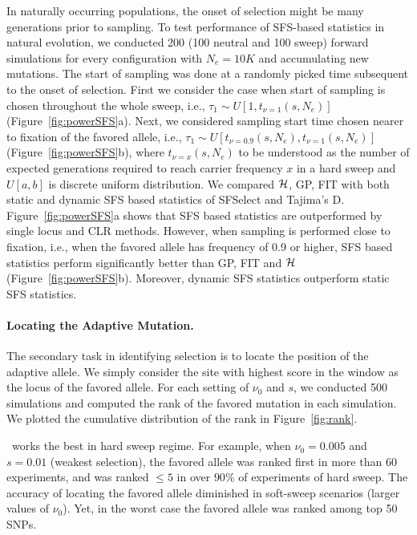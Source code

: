 \documentclass[11pt]{article}
\def\comale{\text{{\sc Comale}}}
\begin{document}
In naturally occurring populations, the onset of selection might be
many generations prior to sampling. To test performance of SFS-based
statistics in natural evolution, we conducted 200 (100 neutral and 100
sweep) forward simulations for every configuration with $N_e=10K$ and
accumulating new mutations. The start of sampling was done at a
randomly picked time subsequent to the onset of selection. First we
consider the case when start of sampling is chosen throughout the
whole sweep, i.e., $\tau_1 \sim U\left[1,t_{\nu=1}(s,N_e)\right]$
(Figure~\ref{fig:powerSFS}a). Next, we considered sampling start time
chosen nearer to fixation of the favored allele, i.e., $\tau_1 \sim
U\left[t_{\nu=0.9}(s,N_e),t_{\nu=1}(s,N_e)\right]$
(Figure~\ref{fig:powerSFS}b), where $t_{\nu=x}(s,N_e)$ to be
understood as the number of expected generations required to reach
carrier frequency $x$ in a hard sweep and $U[a,b]$ is discrete uniform
distribution.  We compared ${\cal H}$, GP, FIT with both static and dynamic
SFS based statistics of SFSelect and Tajima's
D. Figure~\ref{fig:powerSFS}a shows that SFS based statistics are
outperformed by single locus and CLR methods. However, when sampling
is performed close to fixation, i.e., when the favored allele has
frequency of 0.9 or higher, SFS based statistics perform significantly
better than GP, FIT and ${\cal H}$ (Figure~\ref{fig:powerSFS}b). Moreover,
dynamic SFS statistics outperform static SFS statistics.


\paragraph{Locating the Adaptive Mutation.}
The secondary task in identifying selection is to locate the position
of the adaptive allele. We simply consider the site with highest score
in the window as the locus of the favored allele. For each setting
of $\nu_0$ and $s$, we conducted 500 simulations
and computed the rank of the favored mutation in each
simulation. We plotted the cumulative distribution of the rank in
Figure~\ref{fig:rank}.

\comale\ works the best in hard sweep regime. For example, when
$\nu_0=0.005$ and $s=0.01$ (weakest selection), the favored allele was
ranked first in more than 60 experiments, and was ranked $\le 5$ in
over $90$\% of experiments of hard sweep. The accuracy of locating the
favored allele diminished in soft-sweep scenarios (larger values of
$\nu_0$). Yet, in the worst case the favored allele was ranked among
top 50 SNPs.
\end{document}
